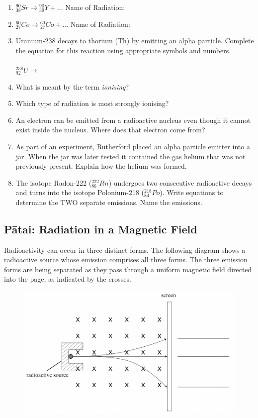 \documentclass[12pt]{report}
\begin{document}
{\begin{enumerate}[itemsep=1cm]
	\item ${}^{90}_{38}Sr \rightarrow {}^{90}_{39}Y + ...$ \hspace{2cm} Name of Radiation:
	\item ${}^{60}_{27}Co \rightarrow {}^{60}_{27}Co + ...$ \hspace{2cm} Name of Radiation:
	\item Uranium-238 decays to thorium (Th) by emitting an alpha particle. Complete the equation for this reaction using appropriate symbols and numbers.\\\\
	${}^{238}_{92}U \rightarrow$
	\item What is meant by the term \textit{ionising}?
	\item Which type of radiation is most strongly ionising?
	\item An electron can be emitted from a radioactive nucleus even though it cannot exist inside the nucleus. Where does that electron come from?\vspace{1cm}
	\item As part of an experiment, Rutherford placed an alpha particle emitter into a jar. When the jar was later tested it contained the gas helium that was not previously present. Explain how the helium was formed.\vspace{1cm}
	\item The isotope Radon-222 (${}^{222}_{86}Rn$) undergoes two consecutive radioactive decays and turns into the isotope Polonium-218 (${}^{218}_{84}Po$). Write equations to determine the TWO separate emissions. Name the emissions.\vspace{1cm}
\end{enumerate}

\subsection{Pātai: Radiation in a Magnetic Field}
Radioactivity can occur in three distinct forms. The following diagram shows a radioactive source whose emission comprises all three forms. The three emission forms are being separated as they pass through a uniform magnetic field directed into the page, as indicated by the crosses.

\begin{figure}[ht]
	\centering
	\includegraphics[width=0.8\linewidth]{radiation-magnetic-field-2.png}
\end{figure}

}
\end{document}
